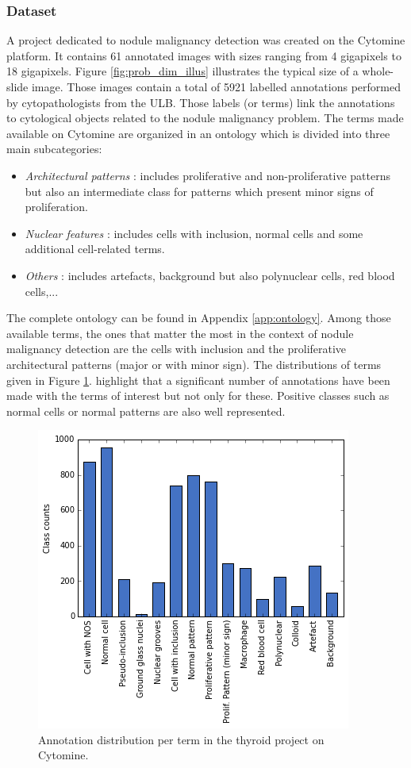 \subsubsection{Dataset}
\label{sssec:detection_thyroid_dataset}
A project dedicated to nodule malignancy detection was created on the Cytomine platform. It contains 61 annotated images with sizes ranging from 4 gigapixels to 18 gigapixels. Figure \ref{fig:prob_dim_illus} illustrates the typical size of a whole-slide image. Those images contain a total of 5921 labelled annotations performed by cytopathologists from the ULB. Those labels (or terms) link the annotations to cytological objects related to the nodule malignancy problem. The terms made available on Cytomine are organized in an ontology which is divided into three main subcategories:

\begin{itemize}
	\item \textit{Architectural patterns} : includes proliferative and non-proliferative patterns but also an intermediate class for patterns which present minor signs of proliferation.
	\item \textit{Nuclear features} : includes cells with inclusion, normal cells and some additional cell-related terms.
	\item \textit{Others} : includes artefacts, background but also polynuclear cells, red blood cells,...
\end{itemize} 

The complete ontology can be found in Appendix \ref{app:ontology}. Among those available terms, the ones that matter the most in the context of nodule malignancy detection are the cells with inclusion and the proliferative architectural patterns (major or with minor sign). The distributions of terms given in Figure \ref{fig:ontology_histograms}.   highlight that a significant number of annotations have been made with the terms of interest but not only for these. Positive classes such as normal cells or normal patterns are also well represented. 

\begin{figure}
	\center
	\includegraphics[scale=0.65]{image/thyroid_annotations.png}
	\caption{Annotation distribution per term in the thyroid project on Cytomine.}
	\label{fig:ontology_histograms}
\end{figure}

